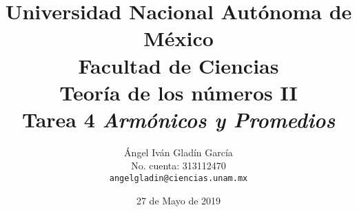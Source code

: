 \documentclass[letterpaper]{article}
\begin{document}
\title{
    \vspace{-2.2em}
        Universidad Nacional Autónoma de México\\
        Facultad de Ciencias\\
        Teoría de los números II\\
    \vspace{.5cm}
    \large
        \textbf{Tarea 4 \emph{Armónicos y Promedios}}
}
\author{
    Ángel Iván Gladín García\\
    No. cuenta: 313112470\\
    \texttt{angelgladin@ciencias.unam.mx}
}
\date{27 de Mayo de 2019}
\maketitle
\end{document}
